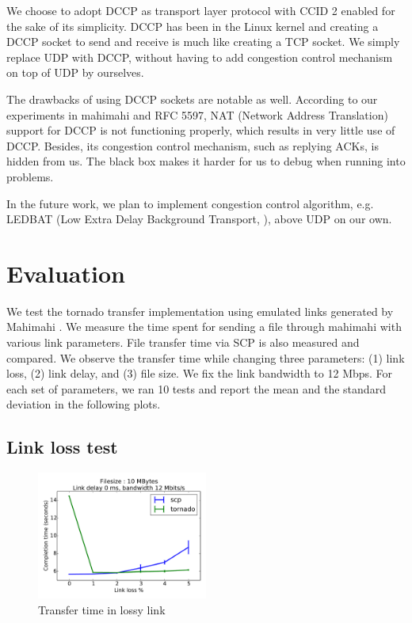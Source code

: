 \documentclass{sig-alternate-10pt}
\begin{document}
We choose to adopt DCCP as transport layer protocol with CCID 2 enabled for the
sake of its simplicity. DCCP has been in the Linux kernel and creating a DCCP
socket to send and receive is much like creating a TCP socket. We simply replace
UDP with DCCP, without having to add congestion control mechanism on top of UDP
by ourselves.

The drawbacks of using DCCP sockets are notable as well. According to our
experiments in mahimahi and RFC 5597, NAT (Network Address Translation) support
for DCCP is not functioning properly, which results in very little use of DCCP.
Besides, its congestion control mechanism, such as replying ACKs, is hidden from
us. The black box makes it harder for us to debug when running into problems.

In the future work, we plan to implement congestion control algorithm, e.g.
LEDBAT (Low Extra Delay Background Transport, \cite{ledbat}), above UDP on our own.

\section{Evaluation}
We test the tornado transfer implementation using emulated links generated by
Mahimahi \cite{mahimahi}. We measure the time spent for sending a file through
mahimahi with various link parameters. File transfer time via SCP is also
measured and compared. We observe the transfer time while changing three
parameters: (1) link loss, (2) link delay, and (3) file size. We fix the link
bandwidth to 12 Mbps. For each set of parameters, we ran 10 tests and report the
mean and the standard deviation in the following plots.

\subsection{Link loss test}

\begin{figure}[t]
  \centering
  \includegraphics[width=0.5\textwidth]{loss-plot}
  \caption{Transfer time in lossy link}
  \label{f:loss-plot}
\end{figure}
\end{document}
